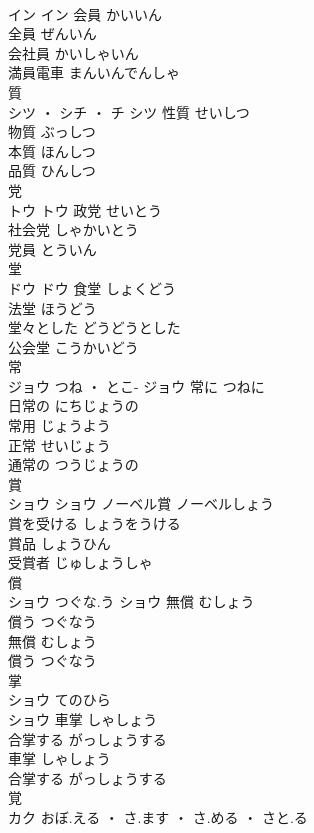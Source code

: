 \documentclass[8pt]{extreport}
\begin{document}
\begin{CJK}{UTF8}{min}
\\	イン		イン	会員	かいいん	
\\	全員	ぜんいん	
\\	会社員	かいしゃいん	
\\	満員電車	まんいんでんしゃ	
\\	質	
\\	シツ ・ シチ ・ チ		シツ	性質	せいしつ	
\\	物質	ぶっしつ	
\\	本質	ほんしつ	
\\	品質	ひんしつ	
\\	党	
\\	トウ		トウ	政党	せいとう	
\\	社会党	しゃかいとう	
\\	党員	とういん	
\\	堂	
\\	ドウ		ドウ	食堂	しょくどう	
\\	法堂	ほうどう	
\\	堂々とした	どうどうとした	
\\	公会堂	こうかいどう	
\\	常	
\\	ジョウ	つね ・ とこ-	ジョウ	常に	つねに	
\\	日常の	にちじょうの	
\\	常用	じょうよう	
\\	正常	せいじょう	
\\	通常の	つうじょうの	
\\	賞	
\\	ショウ		ショウ	ノーベル賞	ノーベルしょう	
\\	賞を受ける	しょうをうける	
\\	賞品	しょうひん	
\\	受賞者	じゅしょうしゃ	
\\	償	
\\	ショウ	つぐな.う	ショウ	無償	むしょう	
\\	償う	つぐなう	
\\	無償	むしょう	
\\	償う	つぐなう	
\\	掌	
\\	ショウ	てのひら
\\	ショウ	車掌	しゃしょう	
\\	合掌する	がっしょうする	
\\	車掌	しゃしょう	
\\	合掌する	がっしょうする	
\\	覚	
\\	カク	おぼ.える ・ さ.ます ・ さ.める ・ さと.る

\end{CJK}
\end{document}
